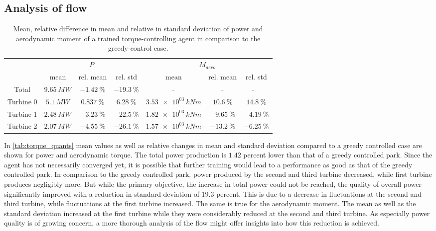 \subsection{Analysis of flow}
\begin{table}[h]
	\centering
	\caption{Mean, relative difference in mean and relative in standard deviation of power and aerodynamic moment of a trained torque-controlling agent in comparison to the greedy-control case.}
	\begin{tabular}{ccccccc}
		\toprule
		& \multicolumn{3}{c}{$P$}  & \multicolumn{3}{c}{$M_{aero}$ }\\ \cmidrule(rl){2-4} \cmidrule(rl){5-7}
		& mean & rel. mean & rel. std  & mean & rel. mean & rel. std \\ \midrule
		Total & $\SI{  9.65}{MW} $ & $\SI{ -1.42}{\%}$ & $\SI{ -19.3}{\%}$ &-&-&- \
		\\
		Turbine 0  & $\SI{   5.1}{MW} $ & $\SI{+0.837}{\%}$ & $\SI{ +6.28}{\%}$ & $\SI{3.53e03}{kNm} $ & $\SI{ +10.6}{\%}$ & $\SI{ +14.8}{\%}$ \\
		Turbine 1  & $\SI{  2.48}{MW} $ & $\SI{ -3.23}{\%}$ & $\SI{ -22.5}{\%}$ & $\SI{1.82e03}{kNm} $ & $\SI{ -9.65}{\%}$ & $\SI{ -4.19}{\%}$ \\
		Turbine 2  & $\SI{  2.07}{MW} $ & $\SI{ -4.55}{\%}$ & $\SI{ -26.1}{\%}$ & $\SI{1.57e03}{kNm} $ & $\SI{ -13.2}{\%}$ & $\SI{ -6.25}{\%}$ \\
		\bottomrule
	\end{tabular}
	\label{tab:torque_quants}
\end{table}
In \autoref{tab:torque_quants} mean values as well as relative changes in mean and standard deviation compared to a greedy controlled case are shown for power and aerodynamic torque. The total power production is $1.42$ percent lower than that of a greedy controlled park. Since the agent has not necessarily converged yet, it is possible that further training would lead to a performance as good as that of the greedy controlled park. In comparison to the greedy controlled park, power produced by the second and third turbine decreased, while first turbine produces negligibly more. But while the primary objective, the increase in total power could not be reached, the quality of overall power significantly improved with a reduction in standard deviation of $19.3$ percent. This is due to a decrease in fluctuations at the second and third turbine, while fluctuations at the first turbine increased. The same is true for the aerodynamic moment. The mean as well as the standard deviation increased at the first turbine while they were considerably reduced at the second and third turbine. As especially power quality is of growing concern, a more thorough analysis of the flow might offer insights into how this reduction is achieved.
